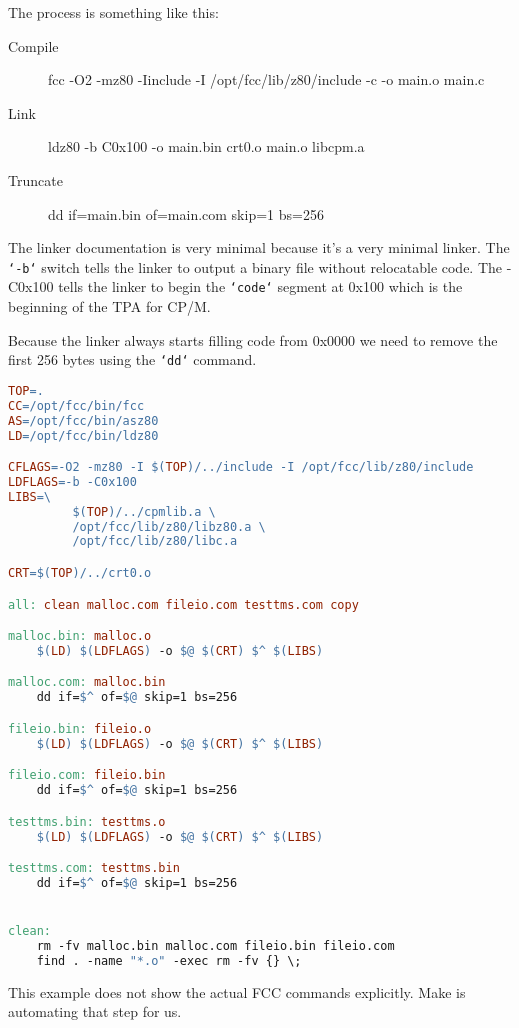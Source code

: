 \documentclass[10pt,a4paper]{article}
\begin{document}
The process is something like this:

\begin{description}
  \item[Compile] fcc -O2 -mz80 -Iinclude -I /opt/fcc/lib/z80/include -c -o
    main.o main.c
  \item[Link] ldz80 -b C0x100 -o main.bin crt0.o main.o libcpm.a
  \item[Truncate] dd if=main.bin of=main.com skip=1 bs=256
\end{description}

The linker documentation is very minimal because it's a very minimal linker.
The \texttt{`-b`} switch tells the linker to output a binary file without
relocatable code.  The -C0x100 tells the linker to begin the \texttt{`code`}
segment at 0x100 which is the beginning of the TPA for CP/M.

Because the linker always starts filling code from 0x0000 we need to remove the
first 256 bytes using the \texttt{`dd`} command.
\pagebreak

\begin{lstlisting}[language=make, caption=Example Makefile]
TOP=.
CC=/opt/fcc/bin/fcc
AS=/opt/fcc/bin/asz80
LD=/opt/fcc/bin/ldz80

CFLAGS=-O2 -mz80 -I $(TOP)/../include -I /opt/fcc/lib/z80/include
LDFLAGS=-b -C0x100
LIBS=\
		 $(TOP)/../cpmlib.a \
		 /opt/fcc/lib/z80/libz80.a \
		 /opt/fcc/lib/z80/libc.a

CRT=$(TOP)/../crt0.o

all: clean malloc.com fileio.com testtms.com copy

malloc.bin: malloc.o
	$(LD) $(LDFLAGS) -o $@ $(CRT) $^ $(LIBS)

malloc.com: malloc.bin
	dd if=$^ of=$@ skip=1 bs=256

fileio.bin: fileio.o
	$(LD) $(LDFLAGS) -o $@ $(CRT) $^ $(LIBS)

fileio.com: fileio.bin
	dd if=$^ of=$@ skip=1 bs=256

testtms.bin: testtms.o
	$(LD) $(LDFLAGS) -o $@ $(CRT) $^ $(LIBS)

testtms.com: testtms.bin
	dd if=$^ of=$@ skip=1 bs=256


clean:
	rm -fv malloc.bin malloc.com fileio.bin fileio.com
	find . -name "*.o" -exec rm -fv {} \;
\end{lstlisting}
\label{lst:makefile}

This example does not show the actual FCC commands explicitly.  Make is
automating that step for us.
\pagebreak
\end{document}
